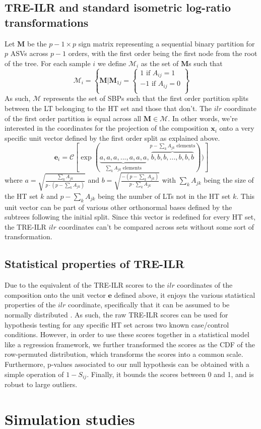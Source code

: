\documentclass{article}
\begin{document}
\subsection{TRE-ILR and standard isometric log-ratio transformations}
\noindent Let $\bm M$ be the $p-1 \times p$ sign matrix representing a sequential binary partition for $p$ ASVs across $p-1$ orders, with the first order being the first node from the root of the tree. For each sample $i$ we define $\mathcal{M}_i$ as the set of $\bm M$s such that 
\[ \mathcal{M}_i = \left\{\bm{M} | \bm{M}_{1j} = \begin{cases}
    1 \text{ if } A_{ij} = 1\\
    -1 \text{ if } A_{ij} = 0\\ 
\end{cases}
\right \}
\]
As such, $\mathcal{M}$ represents the set of SBPs such that the first order partition splits between the LT belonging to the HT set and those that don't. The $ilr$ coordinate of the first order partition is equal across all $\bm{M} \in \mathcal{M}$. In other words, we're interested in the coordinates for the projection of the composition $\bm{x}_{i}$ onto a very specific unit vector defined by the first order split as explained above.  
\[\bm{e}_i = \mathcal{C}[\exp(\underbrace{a, a, a,..., a, a, a}_{\sum_k A_{jk} \text{ elements}},\overbrace{b,b,b,...,b,b,b}^{p - \sum_k A_{jk} \text{ elements}}))] \]  
where $a = \sqrt{\frac{\sum_k A_{jk}}{p \cdot (p - \sum_k A_{jk})}}$ and $b = \sqrt{\frac{-(p - \sum_k A_{jk})}{p \cdot \sum_k A_{jk}}}$ with $\sum_k A_{jk}$ being the size of the HT set $k$ and $p - \sum_k A_{jk}$ being the number of LTs not in the HT set $k$. This unit vector can be part of various other orthonormal bases defined by the subtrees following the initial split. Since this vector is redefined for every HT set, the TRE-ILR $ilr$ coordinates can't be compared across sets without some sort of transformation.  
 
\subsection{Statistical properties of TRE-ILR}
Due to the equivalent of the TRE-ILR scores to the $ilr$ coordinates of the composition onto the unit vector $\bm{e}$ defined above, it enjoys the various statistical properties of the $ilr$ coordinate, specifically that it can be assumed to be normally distributed \cite{egozcue2003,egozcue2005}. As such, the raw TRE-ILR scores can be used for hypothesis testing for any specific HT set across two known case/control conditions. However, in order to use these scores together in a statistical model like a regression framework, we further transformed the scores as the CDF of the row-permuted distribution, which transforms the scores into a common scale. Furthermore, p-values associated to our null hypothesis can be obtained with a simple operation of $1 - S_{ij}$. Finally, it bounds the scores between 0 and 1, and is robust to large outliers.  

\section*{Simulation studies}



\newpage
{}

\end{document}

